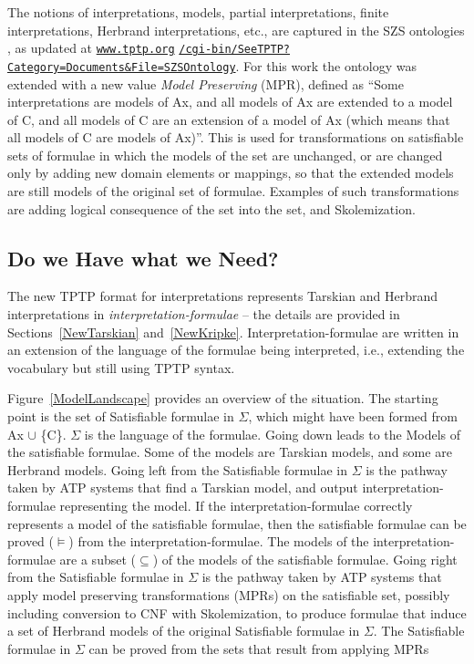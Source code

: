 \documentclass{easychair}
\begin{document}
The notions of interpretations, models, partial interpretations, finite interpretations,
Herbrand interpretations, etc., are captured in the SZS ontologies \cite{Sut08-KEAPPA}, as
updated at 
\href{https://www.tptp.org/cgi-bin/SeeTPTP?Category=Documents\&File=SZSOntology}{\tt www.tptp.org}
\href{https://www.tptp.org/cgi-bin/SeeTPTP?Category=Documents\&File=SZSOntology}{\tt /cgi-bin/SeeTPTP?Category=Documents\&File=SZSOntology}.
For this work the ontology was extended with a new value {\em Model Preserving} (MPR), defined
as ``Some interpretations are models of Ax, and
  all models of Ax are extended to a model of C, and
  all models of C are an extension of a model of Ax
  (which means that all models of C are models of Ax)''.
This is used for transformations on satisfiable sets of formulae in which the models of the set 
are unchanged, or are changed only by adding new domain elements or mappings, so that the
extended models are still models of the original set of formulae. 
Examples of such transformations are adding logical consequence of the set into the set, and
Skolemization.

\subsection{Do we Have what we Need?}
\label{HaveNeed}

The new TPTP format for interpretations represents Tarskian and Herbrand interpretations in 
{\em interpretation-formulae} -- the details are provided in Sections~\ref{NewTarskian} 
and~\ref{NewKripke}.
Interpretation-formulae are written in an extension of the language of the formulae being 
interpreted, i.e., extending the vocabulary but still using TPTP syntax.

Figure~\ref{ModelLandscape} provides an overview of the situation.
The starting point is the set of {\sf Satisfiable formulae in $\Sigma$}, which might have been
formed from {\sf Ax $\cup$ \{{\raisebox{0.4ex}{\texttildelow}}C\}}. 
$\Sigma$ is the language of the formulae.
Going down leads to the {\sf Models} of the satisfiable formulae.
Some of the models are Tarskian models, and some are Herbrand models.
Going left from the {\sf Satisfiable formulae in $\Sigma$} is the pathway taken by ATP systems 
that find a Tarskian model, and output interpretation-formulae representing the model.
If the interpretation-formulae correctly represents a model of the satisfiable formulae, then
the satisfiable formulae can be proved ($\vDash$) from the interpretation-formulae.
The models of the interpretation-formulae are a subset ($\subseteq$) of the models of the
satisfiable formulae.
Going right from the {\sf Satisfiable formulae in $\Sigma$} is the pathway taken by ATP systems
that apply model preserving transformations ({\sf MPR}s) on the satisfiable set, possibly 
including conversion to CNF with Skolemization, to produce formulae that induce a set of 
Herbrand models of the original {\sf Satisfiable formulae in $\Sigma$}.
The {\sf Satisfiable formulae in $\Sigma$} can be proved from the sets that result from applying 
MPRs
\end{document}
